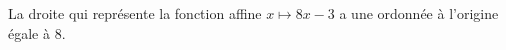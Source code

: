 La droite qui représente la fonction affine $x\mapsto 8x-3$ a une ordonnée à l'origine égale à $8$.

\begin{reponses}
\end{reponses}

\begin{comment}

\end{comment}

